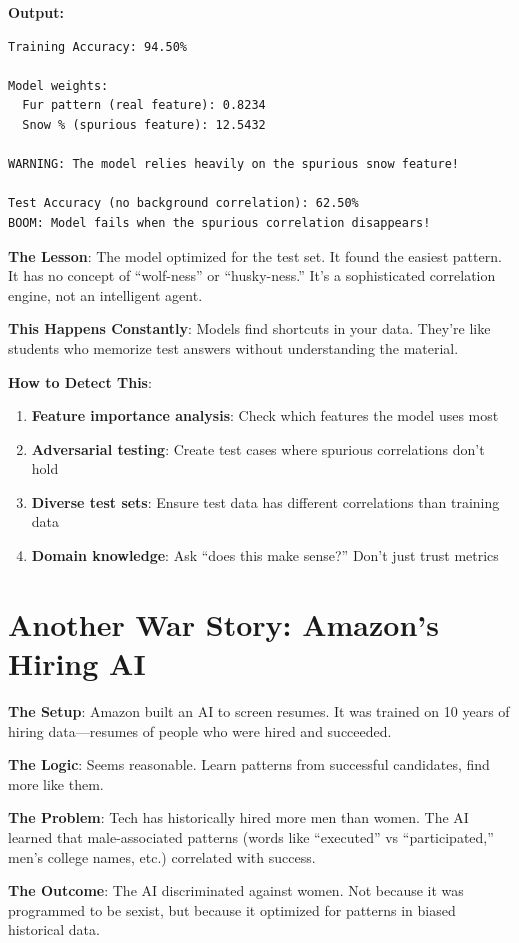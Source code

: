 \documentclass[11pt,oneside]{book}
\begin{document}
\textbf{Output:}
\begin{verbatim}
Training Accuracy: 94.50%

Model weights:
  Fur pattern (real feature): 0.8234
  Snow % (spurious feature): 12.5432

WARNING: The model relies heavily on the spurious snow feature!

Test Accuracy (no background correlation): 62.50%
BOOM: Model fails when the spurious correlation disappears!
\end{verbatim}

\textbf{The Lesson}: The model optimized for the test set. It found the easiest pattern. It has no concept of ``wolf-ness'' or ``husky-ness.'' It's a sophisticated correlation engine, not an intelligent agent.

\textbf{This Happens Constantly}: Models find shortcuts in your data. They're like students who memorize test answers without understanding the material.

\textbf{How to Detect This}:
\begin{enumerate}
\item \textbf{Feature importance analysis}: Check which features the model uses most
\item \textbf{Adversarial testing}: Create test cases where spurious correlations don't hold
\item \textbf{Diverse test sets}: Ensure test data has different correlations than training data
\item \textbf{Domain knowledge}: Ask ``does this make sense?'' Don't just trust metrics
\end{enumerate}

\section{Another War Story: Amazon's Hiring AI}

\textbf{The Setup}: Amazon built an AI to screen resumes. It was trained on 10 years of hiring data---resumes of people who were hired and succeeded.

\textbf{The Logic}: Seems reasonable. Learn patterns from successful candidates, find more like them.

\textbf{The Problem}: Tech has historically hired more men than women. The AI learned that male-associated patterns (words like ``executed'' vs ``participated,'' men's college names, etc.) correlated with success.

\textbf{The Outcome}: The AI discriminated against women. Not because it was programmed to be sexist, but because it optimized for patterns in biased historical data.
\end{document}
